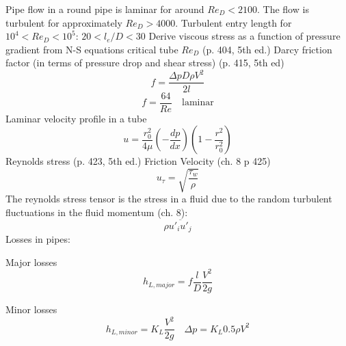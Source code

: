 \documentclass{article}
\begin{document}
Pipe flow in a round pipe is laminar for around $Re_D < 2100$. The flow is turbulent for approximately $Re_D > 4000$.
\newline
\newline
Turbulent entry length for $10^4 < Re_D < 10^5$: $20 < l_e / D < 30$
\newline
\newline
Derive viscous stress as a function of pressure gradient from N-S equations
critical tube $Re_D$ (p. 404, 5th ed.)
\newline
\newline
Darcy friction factor (in terms of pressure drop and shear stress) (p. 415, 5th ed)
\begin{equation}
  f = \frac{\Delta p D \rho V^2}{2l}
\end{equation}
\begin{equation}
  f = \frac{64}{Re}\quad\text{laminar}
\end{equation}
\newline
\newline
Laminar velocity profile in a tube
\begin{equation}
  u = \frac{r_0^2}{4 \mu} \left(- \frac{d p}{d x}\right) \left(1 - \frac{r^2}{r_0^2}\right)
\end{equation}
\newline
\newline
Reynolds stress (p. 423, 5th ed.)
\newline
\newline
Friction Velocity (ch. 8 p 425)
\begin{equation}
  u_\tau = \sqrt{\frac{\tau_w}{\rho}}
\end{equation}
\newline
\newline
The reynolds stress tensor is the stress in a fluid due to the random turbulent fluctuations in the fluid momentum (ch. 8):
\begin{equation}
  \rho \overline{u'_i u'_j}
\end{equation}
\newline
\newline
Losses in pipes:

Major losses
\begin{equation}
  h_{L,major} = f\frac{l}{D}\frac{V^2}{2g}
\end{equation}

Minor losses
\begin{equation}
  h_{L,minor} = K_L\frac{V^2}{2g}\quad \Delta p = K_L 0.5\rho V^2
\end{equation}
\end{document}
